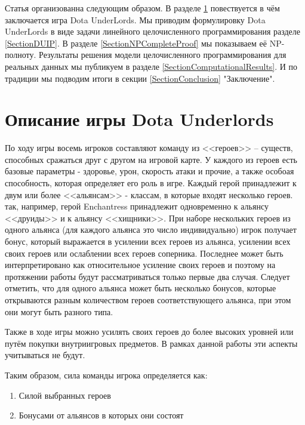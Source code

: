 \documentclass{article}
\begin{document}
Статья организованна следующим образом. В разделе \ref{SectionDUDescription} повествуется в чём заключается игра Dota UnderLords.
Мы приводим формулировку Dota UnderLords в виде задачи линейного целочисленного программирования разделе \ref{SectionDUIP}. В разделе \ref{SectionNPCompleteProof} мы показываем  её NP-полноту. Результаты решения модели целочисленного программирования для реальных данных мы публикуем в разделе \ref{SectionComputationalResults}. И по традиции мы подводим итоги в секции  \ref{SectionConclusion} "Заключение".
 

\section{Описание игры Dota Underlords}
\label{SectionDUDescription}

По ходу игры восемь игроков составляют команду из <<героев>> – существ, способных сражаться друг с другом на игровой карте. У каждого из героев есть базовые параметры - здоровье, урон, скорость атаки и прочие, а также особоая способность, которая определяет его роль в игре. Каждый герой принадлежит к двум или более <<альянсам>> - классам, в которые входят несколько героев. так, например, герой Enchantress принадлежит одновременно к альянсу <<друиды>> и к альянсу <<хищники>>. При наборе нескольких героев из одного альянса (для каждого альянса это число индивидуально) игрок получает бонус, который выражается в усилении всех героев из альянса, усилении всех своих героев или ослаблении всех героев соперника. Последнее может быть интерпретировано как относительное усиление своих героев и поэтому на протяжении работы будут рассматриваться только первые два случая. Следует отметить, что для одного альянса может быть несколько бонусов, которые открываются разным количеством героев соответствующего альянса, при этом они могут быть разного типа.

Также в ходе игры можно усилять своих героев до более высоких уровней или путём покупки внутриигровых предметов. В рамках данной работы эти аспекты учитываться не будут.

Таким образом, сила команды игрока определяется как:

\begin{enumerate}
    \item Силой выбранных героев
    \item Бонусами от альянсов в которых они состоят
\end{enumerate}
\end{document}

